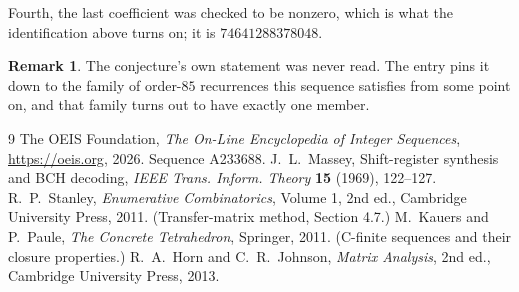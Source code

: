 \documentclass[11pt,a4paper]{article}
\theoremstyle{plain}
\theoremstyle{definition}
\newtheorem{remark}[theorem]{Remark}
\begin{document}
Fourth, the last coefficient was checked to be nonzero, which is what the identification above
turns on; it is $74641288378048$.

\begin{remark}
The conjecture's own statement was never read. The entry pins it down to the family of
order-$85$ recurrences this sequence satisfies from some point on, and that family turns
out to have exactly one member.
\end{remark}

\begin{thebibliography}{9}
 The OEIS Foundation, \emph{The On-Line Encyclopedia of Integer
Sequences}, \url{https://oeis.org}, 2026. Sequence A233688.
 J.~L.~Massey, Shift-register synthesis and BCH decoding, \emph{IEEE
Trans. Inform. Theory} \textbf{15} (1969), 122--127.
 R.~P.~Stanley, \emph{Enumerative Combinatorics}, Volume 1, 2nd ed.,
Cambridge University Press, 2011. (Transfer-matrix method, Section 4.7.)
 M.~Kauers and P.~Paule, \emph{The Concrete Tetrahedron}, Springer, 2011.
(C-finite sequences and their closure properties.)
 R.~A.~Horn and C.~R.~Johnson, \emph{Matrix Analysis}, 2nd ed., Cambridge
University Press, 2013.
\end{thebibliography}
\end{document}
